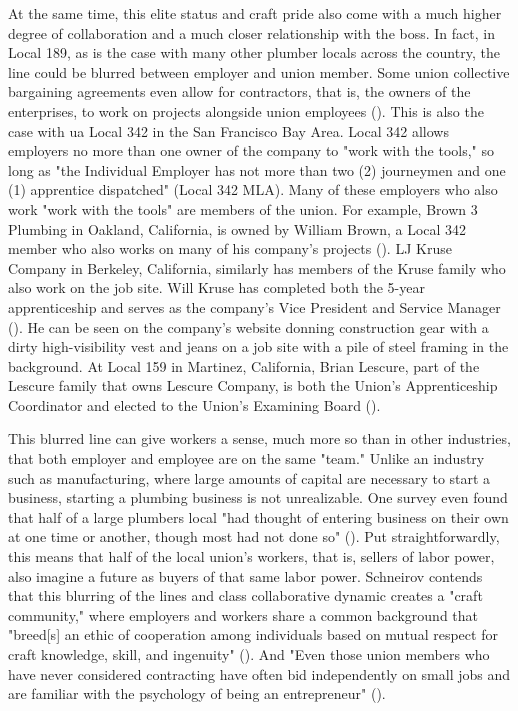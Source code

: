 \documentclass[12pt]{article}
\begin{document}
At the same time, this elite status and craft pride also come with a much higher degree of collaboration and a much closer relationship with the boss. In fact, in Local 189, as is the case with many other plumber locals across the country, the line could be blurred between employer and union member. Some union collective bargaining agreements even allow for contractors, that is, the owners of the enterprises, to work on projects alongside union employees (\cite[5]{schneirovPrideSolidarityHistory1993}). This is also the case with \acrshort{ua} Local 342 in the San Francisco Bay Area. Local 342 allows employers no more than one owner of the company to "work with the tools," so long as "the Individual Employer has not more than two (2) journeymen and one (1) apprentice dispatched" (Local 342 MLA). Many of these employers who also work "work with the tools" are members of the union. For example, Brown 3 Plumbing in Oakland, California, is owned by William Brown, a Local 342 member who also works on many of his company’s projects (\cite{brownplumbingExecutiveSummary}). LJ Kruse Company in Berkeley, California, similarly has members of the Kruse family who also work on the job site. Will Kruse has completed both the 5-year apprenticeship and serves as the company’s Vice President and Service Manager (\cite{ljkruseUs}). He can be seen on the company’s website donning construction gear with a dirty high-visibility vest and jeans on a job site with a pile of steel framing in the background. At Local 159 in Martinez, California, Brian Lescure, part of the Lescure family that owns Lescure Company, is both the Union’s Apprenticeship Coordinator and elected to the Union’s Examining Board (\cite{lescureLinkedIn}).

This blurred line can give workers a sense, much more so than in other industries, that both employer and employee are on the same "team." Unlike an industry such as manufacturing, where large amounts of capital are necessary to start a business, starting a plumbing business is not unrealizable. One survey even found that half of a large plumbers local "had thought of entering business on their own at one time or another, though most had not done so" (\cite[5]{schneirovPrideSolidarityHistory1993}). Put straightforwardly, this means that half of the local union’s workers, that is, sellers of labor power, also imagine a future as buyers of that same labor power. Schneirov contends that this blurring of the lines and class collaborative dynamic creates a "craft community," where employers and workers share a common background that "breed[s] an ethic of cooperation among individuals based on mutual respect for craft knowledge, skill, and ingenuity" (\cite[6]{schneirovPrideSolidarityHistory1993}). And "Even those union members who have never considered contracting have often bid independently on small jobs and are familiar with the psychology of being an entrepreneur" (\cite[5--6]{schneirovPrideSolidarityHistory1993}). 
\end{document}

